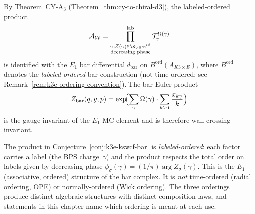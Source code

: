 \begin{conjecture}
\label{conj:k3e-kswcf-bar}
By Theorem~CY-A$_3$ (Theorem~\ref{thm:cy-to-chiral-d3}), the labeled-ordered product
\[
 \mathcal{A}_{\mathcal{W}} = \prod_{\substack{\gamma : Z(\gamma) \in \R_{>0} \cdot e^{i\phi} \\ \text{decreasing phase}}}^{\mathrm{lab}} \mathcal{T}_\gamma^{\Omega(\gamma)}
\]
is identified with the $E_1$ bar differential $d_{\mathrm{bar}}$ on $B^{\mathrm{ord}}(A_{K3 \times E})$, where $B^{\mathrm{ord}}$ denotes the \emph{labeled-ordered} bar construction (not time-ordered; see Remark~\ref{rem:k3e-ordering-convention}). The bar Euler product
\[
 Z_{\mathrm{bar}}(q, y, p) = \exp\!\Bigl(\sum_\gamma \Omega(\gamma) \cdot \sum_{k \geq 1} \frac{x_{k\gamma}}{k}\Bigr)
\]
is the gauge-invariant of the $E_1$ MC element and is therefore wall-crossing invariant.
\end{conjecture}

\begin{remark}
\label{rem:k3e-ordering-convention}
The product in Conjecture~\ref{conj:k3e-kswcf-bar} is \emph{labeled-ordered}: each factor carries a label (the BPS charge~$\gamma$) and the product respects the total order on labels given by decreasing phase $\phi_\sigma(\gamma) = (1/\pi)\arg Z_\sigma(\gamma)$. This is the $E_1$ (associative, ordered) structure of the bar complex. It is \emph{not} time-ordered (radial ordering, OPE) or normally-ordered (Wick ordering). The three orderings produce distinct algebraic structures with distinct composition laws, and statements in this chapter name which ordering is meant at each use.
\end{remark}

